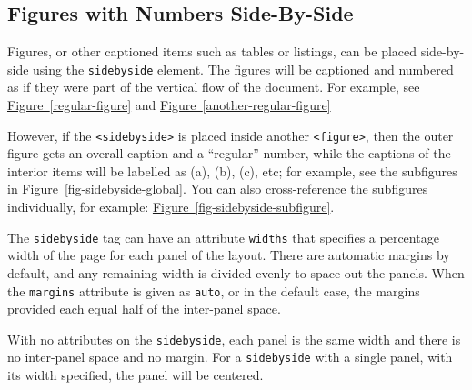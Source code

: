 \documentclass[10pt,]{article}
\theoremstyle{plain}
\theoremstyle{definition}
\theoremstyle{definition}
\theoremstyle{definition}
\theoremstyle{definition}
\theoremstyle{definition}
\theoremstyle{definition}
\numberwithin{equation}{section}
\begin{document}
\subsection[{Figures with Numbers Side-By-Side}]{Figures with Numbers Side-By-Side}\label{subsection-36}
\hypertarget{p-650}{}%
Figures, or other captioned items such as tables or listings, can be placed side-by-side using the \lstinline?sidebyside? element.  The figures will be captioned and numbered as if they were part of the vertical flow of the document.  For example, see \hyperref[regular-figure]{Figure~\ref{regular-figure}} and \hyperref[another-regular-figure]{Figure~\ref{another-regular-figure}}%
\par
\hypertarget{p-651}{}%
However, if the \lstinline?<sidebyside>? is placed inside another \lstinline?<figure>?, then the outer figure gets an overall caption and a ``regular'' number, while the captions of the interior items will be labelled as (a), (b), (c), etc; for example, see the subfigures in \hyperref[fig-sidebyside-global]{Figure~\ref{fig-sidebyside-global}}. You can also cross-reference the subfigures individually, for example: \hyperref[fig-sidebyside-subfigure]{Figure~\ref{fig-sidebyside-subfigure}}.%
\par
\hypertarget{p-652}{}%
The \lstinline?sidebyside? tag can have an attribute \lstinline?widths? that specifies a percentage width of the page for each panel of the layout.  There are automatic margins by default, and any remaining width is divided evenly to space out the panels.  When the \lstinline?margins? attribute is given as \lstinline?auto?, or in the default case, the margins provided each equal half of the inter-panel space.%
\par
\hypertarget{p-653}{}%
With no attributes on the \lstinline?sidebyside?, each panel is the same width and there is no inter-panel space and no margin.  For a \lstinline?sidebyside? with a single panel, with its width specified, the panel will be centered.%
\end{document}
